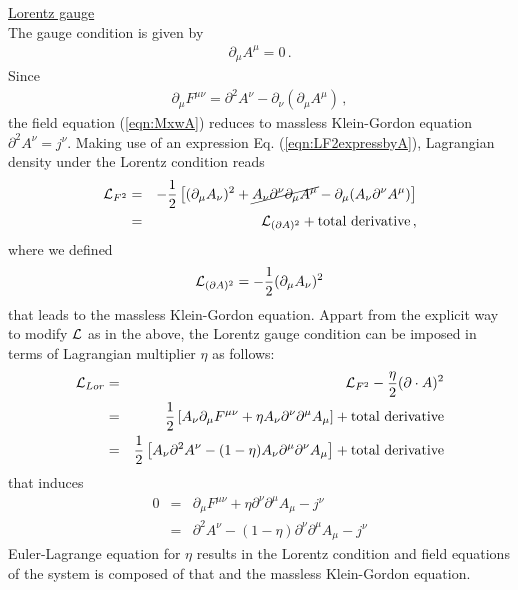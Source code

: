 \bigskip
\noindent
\underline{Lorentz gauge}\\
The gauge condition is given by
\begin{eqnarray}
\partial_\mu A^\mu = 0 \,.
\label{eqn:LorentzCond}
\end{eqnarray}
Since
\begin{eqnarray}
\partial_\mu F^{\mu \nu} = \partial^2 A^\nu - \partial_\nu (\partial_\mu A^\mu)
\,,
\end{eqnarray}
the field equation (\ref{eqn:MxwA}) reduces to massless Klein-Gordon equation
$\partial^2 A^\nu = j^\nu$.
Making use of an expression Eq. (\ref{eqn:LF2expressbyA}), Lagrangian density under 
the Lorentz condition reads
\begin{eqnarray}
{\cal L}_{F^2}
&=&
- \frac{1}{2}
\left[
(\partial_\mu A_\nu)^2 + 
\cancel
{
A_\nu \partial^\nu 
\partial_\mu A^\mu
}
- \partial_\mu (A_\nu \partial^\nu A^\mu)
\right]
\nonumber\\
&=&
{\cal L}_{(\partial A)^2} + \mbox{total derivative}
\,,
\label{eqn:LagF2Lorentz}
\end{eqnarray}
where we defined
\begin{eqnarray}
{\cal L}_{(\partial A)^2}
=
- \frac{1}{2}
(\partial_\mu A_\nu)^2
\label{eqn:LagdenDA2}
\end{eqnarray}
that leads to the massless Klein-Gordon equation.
Appart from the explicit way to modify ${\cal L}$ as in the above, 
the Lorentz gauge condition can be imposed in terms of Lagrangian
multiplier $\eta$ as follows:
\begin{eqnarray}
{\cal L}_{Lor}
&=&
{\cal L}_{F^2}
-
\frac{\eta}{2} (\partial \cdot A)^2
\nonumber\\
&=&
\frac{1}{2}
\left[
A_\nu \partial_\mu F^{\mu \nu}
+
\eta A_\nu \partial^\nu \partial^\mu A_\mu
\right]
+ \mbox{total derivative}
\nonumber\\
&=&
\frac{1}{2}
\left[
A_\nu \partial^2 A^\nu - (1 - \eta) A_\nu \partial^\mu \partial^\nu A_\mu
\right]
+ \mbox{total derivative}
\label{eqn:LorentzLagmultip}
\end{eqnarray}
that induces
\begin{eqnarray}
0
&=&
\partial_\mu F^{\mu \nu}
+ \eta \partial^\nu \partial^\mu A_\mu
- j^\nu
\nonumber\\
&=&
\partial^2 A^\nu
- (1 - \eta)
\partial^\nu \partial^\mu A_\mu
- j^\nu
\end{eqnarray}
Euler-Lagrange equation for $\eta$ results in the Lorentz condition and
field equations of the system is composed of that and the massless Klein-Gordon equation.


